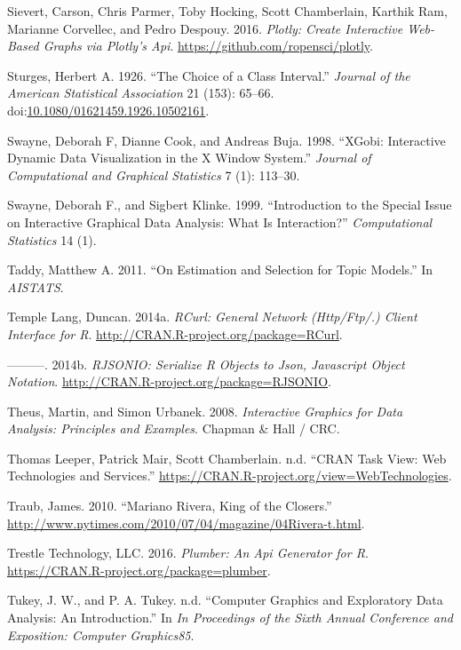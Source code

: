 \documentclass[12pt,]{isuthesis}
\begin{document}
\hypertarget{ref-plotly}{}
Sievert, Carson, Chris Parmer, Toby Hocking, Scott Chamberlain, Karthik
Ram, Marianne Corvellec, and Pedro Despouy. 2016. \emph{Plotly: Create
Interactive Web-Based Graphs via Plotly's Api}.
\url{https://github.com/ropensci/plotly}.

\hypertarget{ref-Sturges}{}
Sturges, Herbert A. 1926. ``The Choice of a Class Interval.''
\emph{Journal of the American Statistical Association} 21 (153): 65--66.
doi:\href{https://doi.org/10.1080/01621459.1926.10502161}{10.1080/01621459.1926.10502161}.

\hypertarget{ref-xgobi}{}
Swayne, Deborah F, Dianne Cook, and Andreas Buja. 1998. ``XGobi:
Interactive Dynamic Data Visualization in the X Window System.''
\emph{Journal of Computational and Graphical Statistics} 7 (1): 113--30.

\hypertarget{ref-swayne-klinke}{}
Swayne, Deborah F., and Sigbert Klinke. 1999. ``Introduction to the
Special Issue on Interactive Graphical Data Analysis: What Is
Interaction?'' \emph{Computational Statistics} 14 (1).

\hypertarget{ref-Taddy}{}
Taddy, Matthew A. 2011. ``On Estimation and Selection for Topic
Models.'' In \emph{AISTATS}.

\hypertarget{ref-RCurl}{}
Temple Lang, Duncan. 2014a. \emph{RCurl: General Network (Http/Ftp/.)
Client Interface for R}. \url{http://CRAN.R-project.org/package=RCurl}.

\hypertarget{ref-RJSONIO}{}
---------. 2014b. \emph{RJSONIO: Serialize R Objects to Json, Javascript
Object Notation}. \url{http://CRAN.R-project.org/package=RJSONIO}.

\hypertarget{ref-mondrianbook}{}
Theus, Martin, and Simon Urbanek. 2008. \emph{Interactive Graphics for
Data Analysis: Principles and Examples}. Chapman \& Hall / CRC.

\hypertarget{ref-WebServices}{}
Thomas Leeper, Patrick Mair, Scott Chamberlain. n.d. ``CRAN Task View:
Web Technologies and Services.''
\url{https://CRAN.R-project.org/view=WebTechnologies}.

\hypertarget{ref-NYT}{}
Traub, James. 2010. ``Mariano Rivera, King of the Closers.''
\url{http://www.nytimes.com/2010/07/04/magazine/04Rivera-t.html}.

\hypertarget{ref-plumber}{}
Trestle Technology, LLC. 2016. \emph{Plumber: An Api Generator for R}.
\url{https://CRAN.R-project.org/package=plumber}.

\hypertarget{ref-scagnostics-tukey}{}
Tukey, J. W., and P. A. Tukey. n.d. ``Computer Graphics and Exploratory
Data Analysis: An Introduction.'' In \emph{In Proceedings of the Sixth
Annual Conference and Exposition: Computer Graphics85}.
\end{document}
